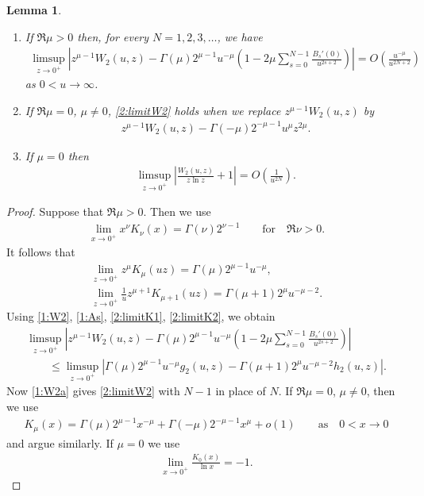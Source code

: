 \documentclass[pdftex]{sigma}
\numberwithin{equation}{section}
\newtheorem{Lemma}[Theorem]{Lemma}
{ \theoremstyle{definition}
\newtheorem{Remarks}[Theorem]{Remarks} }
\begin{document}
\begin{Lemma}\label{2:l3}\quad
\begin{enumerate}\itemsep=0pt
\item[$(a)$] If $\Re \mu>0$ then, for every $N=1,2,3,\dots$, we have
\begin{gather}\label{2:limitW2}
\limsup_{z\to 0^+}\left| z^{\mu-1}W_2(u,z)-\Gamma(\mu)2^{\mu-1}u^{-\mu}\left(1-2\mu\sum_{s=0}^{N-1}\frac{B_s'(0)}{u^{2s+2}}\right)\right|=
O\left(\frac{u^{-\mu}}{u^{2N+2}}\right)
\end{gather}
as $0<u\to\infty$.
\item[$(b)$] If $\Re \mu=0$, $\mu\neq0$, \eqref{2:limitW2} holds when we replace $z^{\mu-1}W_2(u,z)$ by
\begin{gather*}
z^{\mu-1}W_2(u,z)-\Gamma(-\mu)2^{-\mu-1}u^\mu z^{2\mu}.
\end{gather*}
\item[$(c)$] If $\mu=0$ then
\begin{gather*}%
\limsup_{z\to 0^+} \left|\frac{W_2(u,z)}{z\ln z}+1\right|=O\left(\frac{1}{u^{2N}}\right) .
\end{gather*}
\end{enumerate}
\end{Lemma}

\begin{proof}
Suppose that $\Re\mu>0$.
Then we use \cite[(10.30.2)]{NIST}
\begin{gather*}%
\lim_{x\to 0^+} x^\nu K_\nu(x)=\Gamma(\nu)2^{\nu-1}\qquad\text{for} \quad \Re\nu>0.
\end{gather*}
It follows that
\begin{gather}
 \lim_{z\to 0^+} z^\mu K_\mu(uz) = \Gamma(\mu)2^{\mu-1}u^{-\mu}, \label{2:limitK1}\\
 \lim_{z\to 0^+} \frac1u z^{\mu+1} K_{\mu+1}(uz) = \Gamma(\mu+1)2^\mu u^{-\mu-2}.\label{2:limitK2}
\end{gather}
Using \eqref{1:W2}, \eqref{1:As}, \eqref{2:limitK1}, \eqref{2:limitK2}, we obtain
\begin{gather*}
 \limsup_{z\to0^+}\left|z^{\mu-1}W_2(u,z)-\Gamma(\mu)2^{\mu-1}u^{-\mu}\left(1-2\mu\sum_{s=0}^{N-1}\frac{B_s'(0)}{u^{2s+2}}\right)\right|\\
\qquad{}\le\limsup_{z\to0^+} \left|\Gamma(\mu)2^{\mu-1}u^{-\mu}g_2(u,z)- \Gamma(\mu+1)2^\mu u^{-\mu-2}h_2(u,z)\right| .
\end{gather*}
Now \eqref{1:W2a} gives \eqref{2:limitW2} with $N-1$ in place of $N$. If $\Re\mu=0$, $\mu\neq0$, then we use \cite[(9.7)]{O}
\begin{gather*}%
K_\mu(x)=\Gamma(\mu)2^{\mu-1}x^{-\mu}+\Gamma(-\mu)2^{-\mu-1}x^\mu+o(1)\qquad\text{as}\quad 0<x\to0
\end{gather*}
and argue similarly. If $\mu=0$ we use \cite[(10.30.3)]{NIST}
\begin{gather*}
\lim_{x\to 0^+} \frac{K_0(x)}{\ln x} =-1 .\tag*{\qed}
\end{gather*}
\renewcommand{\qed}{}
\end{proof}
\end{document}
